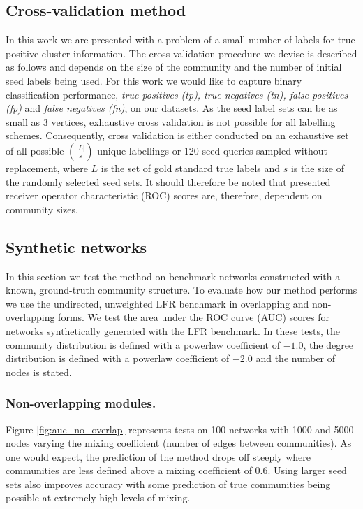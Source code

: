\documentclass[sigconf]{acmart}
\begin{document}
\subsection{Cross-validation method}
\label{sec:cross_validation}
In this work we are presented with a problem of a small number of labels for true positive cluster information.
The cross validation procedure we devise is described as follows and depends on the size of the community and the number of initial seed labels being used.
For this work we would like to capture binary classification  performance, \textit{true positives (tp), true negatives (tn), false positives (fp)} and \textit{false negatives (fn)}, on our datasets.
As the seed label sets can be as small as 3 vertices, exhaustive cross validation is not possible for all labelling schemes.
Consequently, cross validation is either conducted on an exhaustive set of all possible $\binom{|L|}{s}$ unique labellings or 120 seed queries sampled without replacement, where $L$ is the set of gold standard true labels and $s$ is the size of the randomly selected seed sets.
It should therefore be noted that presented receiver operator characteristic (ROC) scores are, therefore, dependent on community sizes.

\subsection{Synthetic networks}
In this section we test the method on benchmark networks constructed with a known, ground-truth community structure.
To evaluate how our method performs we use the undirected, unweighted LFR benchmark \cite{lancichinetti2008benchmark} in overlapping and non-overlapping forms.
We test the area under the ROC curve (AUC) scores for networks synthetically generated with the LFR benchmark.
In these tests, the community distribution is defined with a powerlaw coefficient of $-1.0$, the degree distribution is defined with a powerlaw coefficient of $-2.0$ and the number of nodes is stated.

\subsubsection{Non-overlapping modules.}
Figure \ref{fig:auc_no_overlap} represents tests on 100 networks with 1000 and 5000 nodes varying the mixing coefficient (number of edges between communities).
As one would expect, the prediction of the method drops off steeply where communities are less defined above a mixing coefficient of 0.6.
Using larger seed sets also improves accuracy with some prediction of true communities being possible at extremely high levels of mixing.
\end{document}
